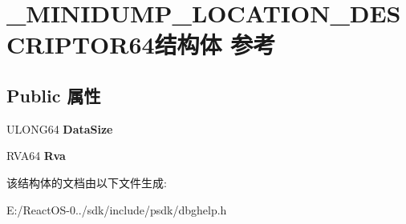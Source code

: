 \hypertarget{struct___m_i_n_i_d_u_m_p___l_o_c_a_t_i_o_n___d_e_s_c_r_i_p_t_o_r64}{}\section{\+\_\+\+M\+I\+N\+I\+D\+U\+M\+P\+\_\+\+L\+O\+C\+A\+T\+I\+O\+N\+\_\+\+D\+E\+S\+C\+R\+I\+P\+T\+O\+R64结构体 参考}
\label{struct___m_i_n_i_d_u_m_p___l_o_c_a_t_i_o_n___d_e_s_c_r_i_p_t_o_r64}
\subsection*{Public 属性}
\begin{DoxyCompactItemize}
\item 
\mbox{\label{struct___m_i_n_i_d_u_m_p___l_o_c_a_t_i_o_n___d_e_s_c_r_i_p_t_o_r64_acd4dcf2320b350fcdae39b06934cce66}} 
U\+L\+O\+N\+G64 {\bfseries Data\+Size}
\item 
\mbox{\label{struct___m_i_n_i_d_u_m_p___l_o_c_a_t_i_o_n___d_e_s_c_r_i_p_t_o_r64_a6799c26ade7321b3af239c0250d19bd7}} 
R\+V\+A64 {\bfseries Rva}
\end{DoxyCompactItemize}


该结构体的文档由以下文件生成\+:\begin{DoxyCompactItemize}
\item 
E\+:/\+React\+O\+S-\/0../sdk/include/psdk/dbghelp.\+h\end{DoxyCompactItemize}
